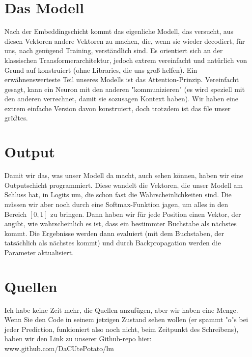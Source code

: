 \documentclass[12pt, letterpaper]{article}
\begin{document}
\section{Das Modell}
Nach der Embeddingschicht kommt das eigenliche Modell, das versucht, aus diesen Vektoren andere Vektoren zu machen, die, wenn sie wieder decodiert, für uns, nach genügend Training, verständlich sind. Es orientiert sich an der klassischen Transformerarchitektur, jedoch extrem vereinfacht und natürlich von Grund auf konstruiert (ohne Libraries, die uns groß helfen). Ein erwähnenswerteste Teil unseres Modells ist das Attention-Prinzip. Vereinfacht gesagt, kann ein Neuron mit den anderen "kommunizieren" (es wird speziell mit den anderen verrechnet, damit sie sozusagen Kontext haben). Wir haben eine extrem einfache Version davon konstruiert, doch trotzdem ist das file unser größtes. 
\section{Output}
Damit wir das, was unser Modell da macht, auch sehen können, haben wir eine Outputschicht programmiert. Diese wandelt die Vektoren, die unser Modell am Schluss hat, in Logits um, die schon fast die Wahrscheinlichkeiten sind. Die müssen wir aber noch durch eine Softmax-Funktion jagen, um alles in den Bereich $[0, 1]$ zu bringen. Dann haben wir für jede Position einen Vektor, der angibt, wie wahrscheinlich es ist, dass ein bestimmter Buchstabe als nächstes kommt. Die Ergebnisse werden dann evaluiert (mit dem Buchstaben, der tatsächlich als nächstes kommt) und durch Backpropagation werden die Parameter aktualisiert. 

\section{Quellen}
Ich habe keine Zeit mehr, die Quellen anzufügen, aber wir haben eine Menge. Wenn Sie den Code in seinem jetzigen Zustand sehen wollen (er spammt "o"s bei jeder Prediction, funkioniert also noch nicht, beim Zeitpunkt des Schreibens), haben wir den Link zu unserer Github-repo hier:\\
www.github.com/DaCUtePotato/lm
\end{document}
